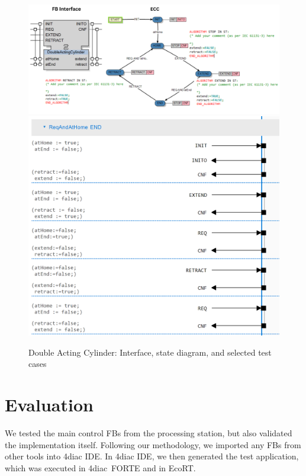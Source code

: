\begin{bibunit}
\begin{figure}[!htbp]
	\centering
		\includegraphics[width=0.99\linewidth,clip]{MX_Papers/Paper10/Figures/DoubleActingCylinderV2.png}
            \includegraphics[width=0.99\linewidth]{MX_Papers/Paper10/Figures/Service-DoubleActingCylinder_selected.png}
		\caption{Double Acting Cylinder: Interface, state diagram, and selected test cases}
		\label{fig:DoubleActingCylinder}	
 \end{figure}

\section{Evaluation}
We tested the main control FBs from the processing station, but also validated the implementation itself. Following our methodology, we imported any FBs from other tools into 4diac IDE. In 4diac IDE, we then generated the test application, which was executed in 4diac~FORTE and in EcoRT.


\end{bibunit}
